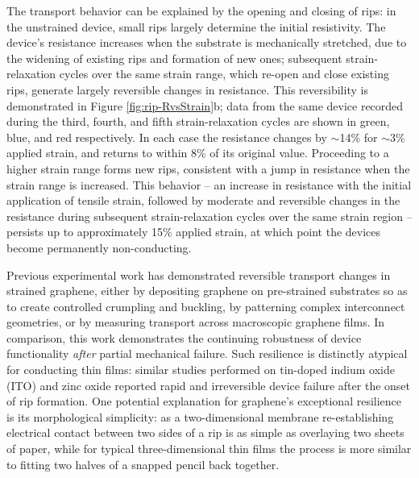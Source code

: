 \documentclass[edeposit,fullpage,draftthesis]{uiucthesis2009}
\begin{document}
        The transport behavior can be explained by the opening and closing of rips: in
        the unstrained device, small rips largely determine the initial resistivity.
        The device's resistance increases when the substrate is mechanically stretched,
        due to the widening of existing rips and formation of new ones; subsequent
        strain-relaxation cycles over the same strain range, which re-open and close
        existing rips, generate largely reversible changes in resistance. This
        reversibility is demonstrated in Figure \ref{fig:rip-RvsStrain}b; data from the same device recorded
        during the third, fourth, and fifth strain-relaxation cycles are shown in
        green, blue, and red respectively. In each case the resistance changes by
        $\sim$14\% for $\sim$3\% applied strain, and returns to within 8\% of its
        original value. Proceeding to a higher strain range forms new rips, consistent
        with a jump in resistance when the strain range is increased. This behavior --
        an increase in resistance with the initial application of tensile strain,
        followed by moderate and reversible changes in the resistance during subsequent
        strain-relaxation cycles over the same strain region -- persists up to
        approximately 15\% applied strain, at which point the devices become
        permanently non-conducting.
        
        Previous experimental work has demonstrated reversible transport changes in
        strained graphene, either by depositing graphene on pre-strained substrates so
        as to create controlled crumpling\cite{Zang2013} and buckling\cite{Wang2011},
        by patterning complex interconnect geometries\cite{Kim2011,Lee2010}, or by
        measuring transport across macroscopic graphene films\cite{Kim2009,Bae2010}. In
        comparison, this work demonstrates the continuing robustness of device
        functionality \textit{after} partial mechanical failure. Such resilience is
        distinctly atypical for conducting thin films: similar studies performed on
        tin-doped indium oxide (ITO)\cite{Cairns2000} and zinc
        oxide\cite{Fortunato2002} reported rapid and irreversible device failure after
        the onset of rip formation.  One potential explanation for graphene's
        exceptional resilience is its morphological simplicity: as a two-dimensional
        membrane re-establishing electrical contact between two sides of a rip is as
        simple as overlaying two sheets of paper, while for typical three-dimensional
        thin films the process is more similar to fitting two halves of a snapped
        pencil back together.
        
\end{document}
